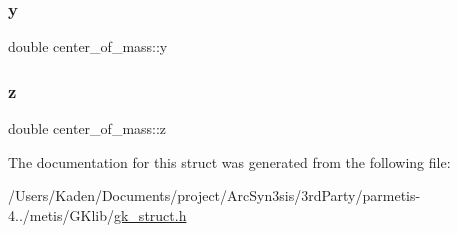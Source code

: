 \subsubsection{\texorpdfstring{y}{y}}
{\footnotesize\ttfamily double center\+\_\+of\+\_\+mass\+::y}

\mbox{\label{a00662_a7dc0bfbcd0169218cefa37050731df2e}} 
\subsubsection{\texorpdfstring{z}{z}}
{\footnotesize\ttfamily double center\+\_\+of\+\_\+mass\+::z}



The documentation for this struct was generated from the following file\+:\begin{DoxyCompactItemize}
\item 
/\+Users/\+Kaden/\+Documents/project/\+Arc\+Syn3sis/3rd\+Party/parmetis-\/4../metis/\+G\+Klib/\hyperlink{a00080}{gk\+\_\+struct.\+h}\end{DoxyCompactItemize}
